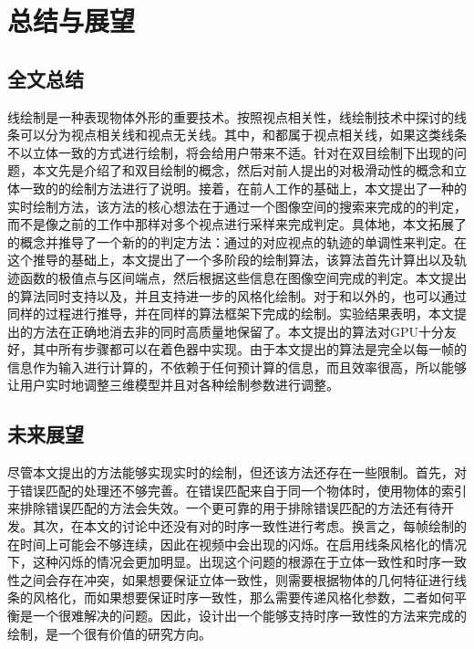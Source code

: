 \chapter{总结与展望}

\section{全文总结}

线绘制是一种表现物体外形的重要技术。按照视点相关性，线绘制技术中探讨的线条可以分为视点相关线和视点无关线。其中，\con{}和\scon{}都属于视点相关线，如果这类线条不以立体一致的方式进行绘制，将会给用户带来不适。针对\vdl{}在双目绘制下出现的问题，本文先是介绍了\vdl{}和双目绘制的概念，然后对前人提出的对极滑动性的概念和立体一致的\vdl{}的绘制方法进行了说明。接着，在前人工作的基础上，本文提出了一种\stc{}\vdl{}的实时绘制方法，该方法的核心想法在于通过一个图像空间的搜索来完成\vdp{}的\epsl{}的判定，而不是像之前的工作中那样对多个视点进行采样来完成\epsl{}判定。具体地，本文拓展了\epsl{}的概念并推导了一个新的\epsl{}的判定方法：通过\vdp{}的对应视点的轨迹的单调性来判定\epsl{}。在这个推导的基础上，本文提出了一个多阶段的绘制算法，该算法首先计算出\vdl{}以及轨迹函数的极值点与区间端点，然后根据这些信息在图像空间完成\epsl{}的判定。本文提出的算法同时支持\con{}以及\scon{}，并且支持进一步的风格化绘制。对于\con{}和\scon{}以外的\vdl{}，也可以通过同样的过程进行推导，并在同样的算法框架下完成\stc{}的绘制。实验结果表明，本文提出的方法在正确地消去非\stc{}\vdl{}的同时高质量地保留了\stc{}\epsl{}。本文提出的算法对GPU十分友好，其中所有步骤都可以在着色器中实现。由于本文提出的算法是完全以每一帧的信息作为输入进行计算的，不依赖于任何预计算的信息，而且效率很高，所以能够让用户实时地调整三维模型并且对各种绘制参数进行调整。

\section{未来展望}

尽管本文提出的方法能够实现实时的\stc{}\vdl{}绘制，但还该方法还存在一些限制。首先，对于错误匹配的处理还不够完善。在错误匹配来自于同一个物体时，使用物体的索引来排除错误匹配的方法会失效。一个更可靠的用于排除错误匹配的方法还有待开发。其次，在本文的讨论中还没有对\vdl{}的时序一致性进行考虑。换言之，每帧绘制的\vdl{}在时间上可能会不够连续，因此在视频中会出现\vdl{}的闪烁。在启用线条风格化的情况下，这种闪烁的情况会更加明显。出现这个问题的根源在于立体一致性和时序一致性之间会存在冲突，如果想要保证立体一致性，则需要根据物体的几何特征进行线条的风格化，而如果想要保证时序一致性，那么需要传递风格化参数，二者如何平衡是一个很难解决的问题。因此，设计出一个能够支持时序一致性的方法来完成\stc{}\vdl{}的绘制，是一个很有价值的研究方向。